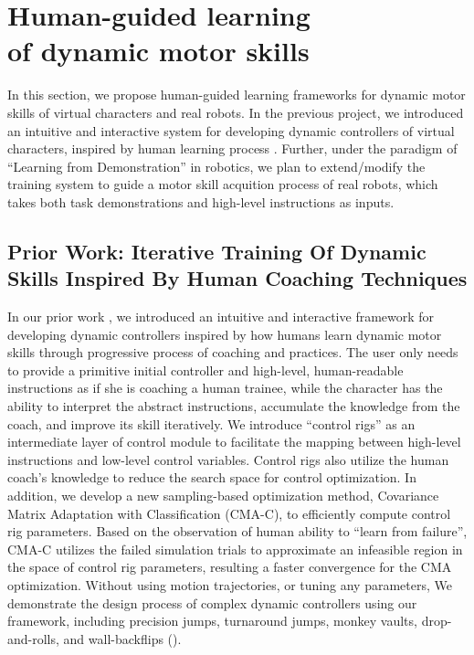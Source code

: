 \chapter{Human-guided learning \protect\\ of dynamic motor skills}

\indent

In this section, we propose human-guided learning frameworks for
dynamic motor skills of virtual characters and real robots.
In the previous project, we introduced an intuitive and 
interactive system for developing dynamic controllers 
of virtual characters,
inspired by human learning process \cite{fitts:1967:hp}.
Further, under the paradigm of ``Learning from Demonstration''
in robotics,
we plan to extend/modify the training system to guide 
a motor skill acquition process of real robots, which
takes both task demonstrations and high-level instructions as inputs.

\section{Prior Work: Iterative Training Of Dynamic Skills Inspired By Human Coaching Techniques}

\indent

In our prior work \cite{Ha:2014:ITD},
we introduced an intuitive and interactive framework for developing 
dynamic controllers inspired by how humans learn dynamic motor
skills through progressive process of coaching and practices. 
The user only needs to provide a primitive initial controller and
high-level, human-readable instructions as if
she is coaching a human trainee, while the character has the ability
to interpret the abstract instructions, accumulate the knowledge from
the coach, and improve its skill iteratively. We introduce ``control
rigs'' as an intermediate layer of control module to facilitate the
mapping between high-level instructions and low-level control
variables. Control rigs also utilize the human coach's knowledge to
reduce the search space for control optimization. In addition, we
develop a new sampling-based optimization method, Covariance Matrix
Adaptation with Classification (CMA-C), to efficiently compute control
rig parameters. Based on the observation of human ability to ``learn
from failure'', CMA-C utilizes the failed simulation trials to
approximate an infeasible region in the space of control rig
parameters, resulting a faster convergence for the CMA
optimization. 
Without using motion trajectories, or tuning any parameters,
We demonstrate the design process of complex dynamic
controllers using our framework, including precision jumps, turnaround
jumps, monkey vaults, drop-and-rolls, and wall-backflips 
().


